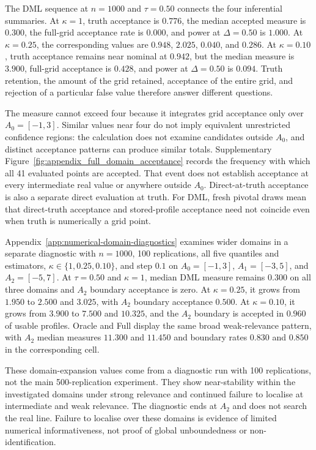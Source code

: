 The DML sequence at $n=1000$ and $\tau=0.50$ connects the four inferential summaries. At $\kappa=1$, truth acceptance is $0.776$, the median accepted measure is $0.300$, the full-grid acceptance rate is $0.000$, and power at $\Delta=0.50$ is $1.000$. At $\kappa=0.25$, the corresponding values are $0.948$, $2.025$, $0.040$, and $0.286$. At $\kappa=0.10$, truth acceptance remains near nominal at $0.942$, but the median measure is $3.900$, full-grid acceptance is $0.428$, and power at $\Delta=0.50$ is $0.094$. Truth retention, the amount of the grid retained, acceptance of the entire grid, and rejection of a particular false value therefore answer different questions.

The measure cannot exceed four because it integrates grid acceptance only over $A_0=[-1,3]$. Similar values near four do not imply equivalent unrestricted confidence regions: the calculation does not examine candidates outside $A_0$, and distinct acceptance patterns can produce similar totals. Supplementary Figure~\ref{fig:appendix_full_domain_acceptance} records the frequency with which all 41 evaluated points are accepted. That event does not establish acceptance at every intermediate real value or anywhere outside $A_0$. Direct-at-truth acceptance is also a separate direct evaluation at truth. For DML, fresh pivotal draws mean that direct-truth acceptance and stored-profile acceptance need not coincide even when truth is numerically a grid point.

Appendix~\ref{app:numerical-domain-diagnostics} examines wider domains in a separate diagnostic with $n=1000$, 100 replications, all five quantiles and estimators, $\kappa\in\{1,0.25,0.10\}$, and step $0.1$ on $A_0=[-1,3]$, $A_1=[-3,5]$, and $A_2=[-5,7]$. At $\tau=0.50$ and $\kappa=1$, median DML measure remains $0.300$ on all three domains and $A_2$ boundary acceptance is zero. At $\kappa=0.25$, it grows from $1.950$ to $2.500$ and $3.025$, with $A_2$ boundary acceptance $0.500$. At $\kappa=0.10$, it grows from $3.900$ to $7.500$ and $10.325$, and the $A_2$ boundary is accepted in $0.960$ of usable profiles. Oracle and Full display the same broad weak-relevance pattern, with $A_2$ median measures $11.300$ and $11.450$ and boundary rates $0.830$ and $0.850$ in the corresponding cell.

These domain-expansion values come from a diagnostic run with 100 replications, not the main 500-replication experiment. They show near-stability within the investigated domains under strong relevance and continued failure to localise at intermediate and weak relevance. The diagnostic ends at $A_2$ and does not search the real line. Failure to localise over these domains is evidence of limited numerical informativeness, not proof of global unboundedness or non-identification.

